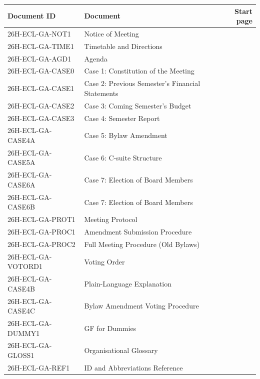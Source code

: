 \documentclass{../../Common/Latex/Templates/rapport}
\begin{document}
\small
\renewcommand{\arraystretch}{1.12}
\begin{tabularx}{\textwidth}{@{}>{\ttfamily}l@{\quad}X@{\quad}r@{}}
    \textnormal{Document ID} & \textnormal{Document}                            & \textnormal{Start page} \\
    \hline
    26H-ECL-GA-NOT1          & Notice of Meeting                                & \pageref{doc:not1}      \\
    26H-ECL-GA-TIME1         & Timetable and Directions                         & \pageref{doc:time1}     \\
    26H-ECL-GA-AGD1          & Agenda                                           & \pageref{doc:agd1}      \\
    26H-ECL-GA-CASE0         & Case 1: Constitution of the Meeting              & \pageref{doc:case0}     \\
    26H-ECL-GA-CASE1         & Case 2: Previous Semester's Financial Statements & \pageref{doc:case1}     \\
    26H-ECL-GA-CASE2         & Case 3: Coming Semester's Budget                 & \pageref{doc:case2}     \\
    26H-ECL-GA-CASE3         & Case 4: Semester Report                          & \pageref{doc:case3}     \\
    26H-ECL-GA-CASE4A        & Case 5: Bylaw Amendment                          & \pageref{doc:case4a}    \\
    26H-ECL-GA-CASE5A        & Case 6: C-suite Structure                        & \pageref{doc:case5a}    \\
    26H-ECL-GA-CASE6A        & Case 7: Election of Board Members                & \pageref{doc:case6a}    \\
    26H-ECL-GA-CASE6B        & Case 7: Election of Board Members                & \pageref{doc:case6b}    \\
    26H-ECL-GA-PROT1         & Meeting Protocol                                 & \pageref{doc:prot1}     \\
    26H-ECL-GA-PROC1         & Amendment Submission Procedure                   & \pageref{doc:proc1}     \\
    26H-ECL-GA-PROC2         & Full Meeting Procedure (Old Bylaws)              & \pageref{doc:proc2}     \\
    26H-ECL-GA-VOTORD1       & Voting Order                                     & \pageref{doc:votord1}   \\
    26H-ECL-GA-CASE4B        & Plain-Language Explanation                       & \pageref{doc:case4b}    \\
    26H-ECL-GA-CASE4C        & Bylaw Amendment Voting Procedure                 & \pageref{doc:case4c}    \\
    26H-ECL-GA-DUMMY1        & GF for Dummies                                   & \pageref{doc:dummy1}    \\
    26H-ECL-GA-GLOSS1        & Organisational Glossary                          & \pageref{doc:gloss1}    \\
    26H-ECL-GA-REF1          & ID and Abbreviations Reference                   & \pageref{doc:ref1}      \\
\end{tabularx}
\normalsize
\end{document}
